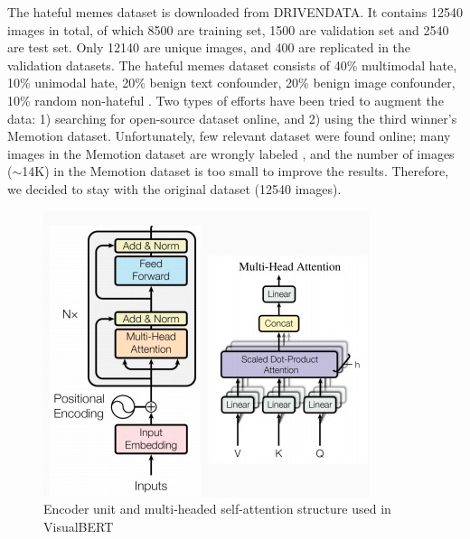 \documentclass[10pt,twocolumn,letterpaper]{article}
\begin{document}
The hateful memes dataset is downloaded from DRIVENDATA. It contains 12540 images in total, of which 8500 are training set, 1500 are validation set and 2540 are test set. Only 12140 are unique images, and 400 are replicated in the validation datasets. The hateful memes dataset consists of 40\% multimodal hate, 10\% unimodal hate, 20\% benign text confounder, 20\% benign image confounder, 10\% random non-hateful \cite{g_kiela2021hateful}. Two types of efforts have been tried to augment the data: 1) searching for open-source dataset online, and 2) using the third winner’s Memotion dataset. Unfortunately, few relevant dataset were found online; many images in the Memotion dataset are wrongly labeled \cite{e_velioglu2020detecting}, and the number of images ($ \sim $14K) in the Memotion dataset 
is too small to improve the results. Therefore, we decided to stay with the original dataset (12540 images).

\begin{figure}[t]
\begin{center}
   \includegraphics[width=1 \linewidth]{Figure2.png}
\end{center}
   \caption{Encoder unit and multi-headed self-attention structure used in VisualBERT \cite{a_vaswani2017attention}}
\label{fig:encoder}
\end{figure}
\end{document}
